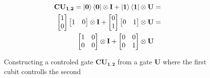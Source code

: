 \begin{figure}[H]
    \begin{align*}
        \mathbf{CU_{1,2}}=\ket{\mathbf{0}}\bra{\mathbf{0}}\otimes\mathbf{I} + \ket{\mathbf{1}}\bra{\mathbf{1}}\otimes\mathbf{U}&=\\
        \begin{bmatrix}
            1 \\
            0 \\
        \end{bmatrix}
        \begin{bmatrix}
            1 & 0 \\
        \end{bmatrix}
        \otimes\mathbf{I} + 
        \begin{bmatrix}
            0 \\
            1 \\
        \end{bmatrix}
        \begin{bmatrix}
            0 & 1 \\
        \end{bmatrix}
        \otimes\mathbf{U}&=\\
        \begin{bmatrix}
            1 & 0 \\
            0 & 0 \\
        \end{bmatrix}
        \otimes\mathbf{I} + 
        \begin{bmatrix}
            0 & 0 \\
            0 & 1 \\
        \end{bmatrix}
        \otimes\mathbf{U}& 
    \end{align*}
    \caption{Constructing a controled gate $\mathbf{CU_{1,2}}$ from a gate $\mathbf{U}$ where the first cubit controlls the second}
    \label{fig:CU1}
\end{figure}
